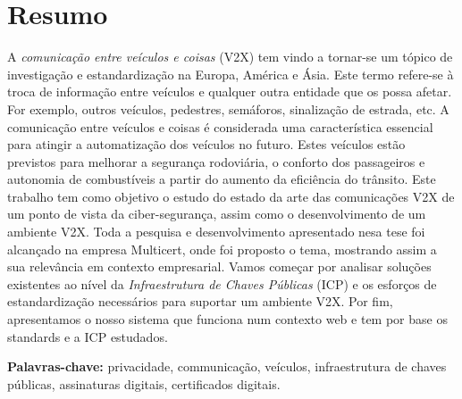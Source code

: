 
\section*{Resumo}

A \textit{comunicação entre veículos e coisas} (V2X) tem vindo a tornar-se um tópico de investigação e estandardização na Europa, América e Ásia. Este termo refere-se à troca de informação entre veículos e qualquer outra entidade que os possa afetar. For exemplo, outros veículos, pedestres, semáforos, sinalização de estrada, etc. A comunicação entre veículos e coisas é considerada uma característica essencial para atingir a automatização dos veículos no futuro. Estes veículos estão previstos para melhorar a segurança rodoviária, o conforto dos passageiros e autonomia de combustíveis a partir do aumento da eficiência do trânsito. Este trabalho tem como objetivo o estudo do estado da arte das comunicações V2X de um ponto de vista da ciber-segurança, assim como o desenvolvimento de um ambiente V2X. Toda a pesquisa e desenvolvimento apresentado nesa tese foi alcançado na empresa Multicert, onde foi proposto o tema, mostrando assim a sua relevância em contexto empresarial.
Vamos começar por analisar soluções existentes ao nível da \textit{Infraestrutura de Chaves Públicas} (ICP) e os esforços de estandardização necessários para suportar um ambiente V2X.
Por fim, apresentamos o nosso sistema que funciona num contexto web e tem por base os standards e a ICP
estudados.

\vfill

\textbf{\Large Palavras-chave:} privacidade, communicação, veículos, infraestrutura de chaves públicas, assinaturas digitais, certificados digitais.

